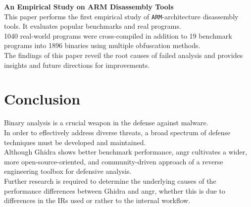 \documentclass[seminar]{plai}
\begin{document}
\noindent\textbf{An Empirical Study on ARM Disassembly Tools}\\
This paper performs the first empirical study of \texttt{ARM}-architecture disassembly tools. It evaluates popular benchmarks and real programs.\\
1040 real-world programs were cross-compiled in addition to 19 benchmark programs into 1896 binaries using multiple obfuscation methods.\\
The findings of this paper reveil the root causes of failed analysis and provides insights and future directions for improvements.\cite{an-empirical-study-on-ARM-disassembly-disassembly-tools} 

\section{Conclusion}
\label{sec:conclusion}
Binary analysis is a crucial weapon in the defense against malware.\\
In order to effectively address diverse threats, a broad spectrum of defense techniques must be developed and maintained.\\
Although Ghidra shows better benchmark performance, angr cultivates a wider, more open-source-oriented, and community-driven approach of a reverse engineering toolbox for defensive analysis.\\
Further research is required to determine the underlying causes of the performance differences between Ghidra and angr, whether this is due to differences in the IRs used or rather to the internal workflow. 


\end{document}
